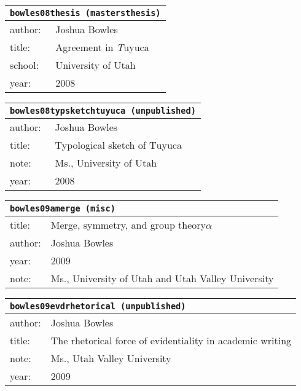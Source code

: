 \documentclass{article}
\begin{document}
\begin{tabular}{p{}p{}}
\multicolumn{2}{l}{\texttt{bowles08thesis (mastersthesis)}}\\
\hline
author: & Joshua Bowles\\
title: & Agreement in \textsc{{\it T}}uyuca\\
school: & University of Utah\\
year: & 2008\\
\end{tabular}

\bigskip

\begin{tabular}{p{}p{}}
\multicolumn{2}{l}{\texttt{bowles08typsketchtuyuca (unpublished)}}\\
\hline
author: & Joshua Bowles\\
title: & Typological sketch of \textsc{T}uyuca\\
note: & \textsc{M}s., University of Utah\\
year: & 2008\\
\end{tabular}

\bigskip

\begin{tabular}{p{}p{}}
\multicolumn{2}{l}{\texttt{bowles09amerge (misc)}}\\
\hline
title: & \textsc{M}erge, symmetry, and group theory$\alpha$\\
author: & Joshua Bowles\\
year: & 2009\\
note: & \textsc{M}s., University of Utah and Utah Valley University\\
\end{tabular}

\bigskip

\begin{tabular}{p{}p{}}
\multicolumn{2}{l}{\texttt{bowles09evdrhetorical (unpublished)}}\\
\hline
author: & Joshua Bowles\\
title: & The rhetorical force of evidentiality in academic writing\\
note: & \textsc{M}s., Utah Valley University\\
year: & 2009\\
\end{tabular}

\bigskip
\end{document}
